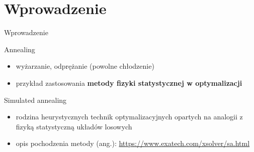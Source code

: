 \section{Wprowadzenie}
	\begin{frame}{Wprowadzenie}
		\begin{block}{Annealing}
			\begin{itemize}
				\item wyżarzanie, odprężanie (powolne chłodzenie)	
				\item przykład zastosowania \textbf{metody fizyki statystycznej w optymalizacji} \cite{kirkpatrick}
			\end{itemize}
		\end{block}
	
		\begin{block}{Simulated annealing}
			\begin{itemize}
				\item rodzina heurystycznych technik optymalizacyjnych opartych na analogii z fizyką statystyczną układów losowych 
				\item opis pochodzenia metody (ang.): \url{https://www.exatech.com/xsolver/sa.html}					
			\end{itemize}
		\end{block}	
	\end{frame}
